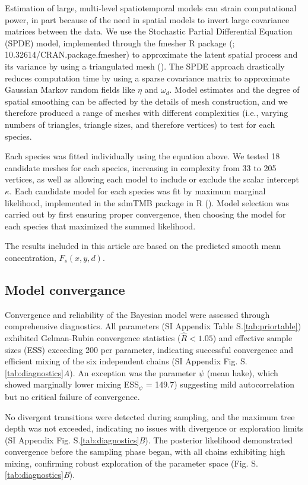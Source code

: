 \documentclass{article}
\begin{document}
Estimation of large, multi-level spatiotemporal models can strain computational power, in part because of the need in spatial models to invert large covariance matrices between the data. We use the Stochastic Partial Differential Equation (SPDE) model, implemented through the fmesher R package (\cite{lindgren2024}; 10.32614/CRAN.package.fmesher) to approximate the latent spatial process and its variance by using a triangulated mesh (\cite{lindgren2011}). The SPDE approach drastically reduces computation time by using a sparse covariance matrix to approximate Gaussian Markov random fields like $\eta$ and $\omega_d$. Model estimates and the degree of spatial smoothing can be affected by the details of mesh construction, and we therefore produced a range of meshes with different complexities (i.e., varying numbers of triangles, triangle sizes, and therefore vertices) to test for each species. 

Each species was fitted individually using the equation above. We tested 18 candidate meshes for each species, increasing in complexity from 33 to 205 vertices, as well as allowing each model to include or exclude the scalar intercept $\kappa$. Each candidate model for each species was fit by maximum marginal likelihood, implemented in the sdmTMB package in R (\cite{anderson2022}). Model selection was carried out by first ensuring proper convergence, then choosing the model for each species that maximized the summed likelihood.

The results included in this article are based on the predicted smooth mean concentration, $F_s(x,y,d)$.

\subsection*{Model convergance}

Convergence and reliability of the Bayesian model were assessed through comprehensive diagnostics. All parameters (SI Appendix Table S.\ref{tab:priortable}) exhibited Gelman-Rubin convergence statistics ($\hat{R} < 1.05$) and effective sample sizes (ESS) exceeding 200 per parameter, indicating successful convergence and efficient mixing of the six independent chains (SI Appendix Fig. S.\ref{tab:diagnostics}\textit{A}). An exception was the parameter $\psi$ (mean hake), which showed marginally lower mixing ESS$_\psi$ = 149.7) suggesting mild autocorrelation but no critical failure of convergence.

No divergent transitions were detected during sampling, and the maximum tree depth was not exceeded, indicating no issues with divergence or exploration limits (SI Appendix Fig. S.\ref{tab:diagnostics}\textit{B}). The posterior likelihood demonstrated convergence before the sampling phase began, with all chains exhibiting high mixing, confirming robust exploration of the parameter space (Fig. S.\ref{tab:diagnostics}\textit{B}).
\end{document}
